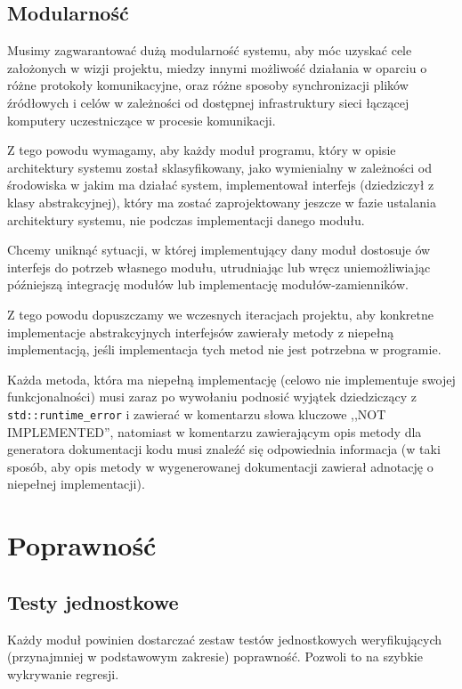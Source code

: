 \documentclass[a4paper]{article}
\begin{document}
\subsection{Modularność}

Musimy zagwarantować dużą modularność systemu, aby móc uzyskać cele założonych w wizji projektu, miedzy innymi możliwość działania w oparciu o różne protokoły komunikacyjne, oraz różne sposoby synchronizacji plików źródłowych i celów w zależności od dostępnej infrastruktury sieci łączącej komputery uczestniczące w procesie komunikacji.

Z tego powodu wymagamy, aby każdy moduł programu, który w opisie architektury systemu został sklasyfikowany, jako wymienialny w zależności od środowiska w jakim ma działać system, implementował interfejs (dziedziczył z klasy abstrakcyjnej), który ma zostać zaprojektowany jeszcze w fazie ustalania architektury systemu, nie podczas implementacji danego modułu.

Chcemy uniknąć sytuacji, w której implementujący dany moduł dostosuje ów interfejs do potrzeb własnego modułu, utrudniając lub wręcz uniemożliwiając późniejszą integrację modułów lub implementację modułów-zamienników.

Z tego powodu dopuszczamy we wczesnych iteracjach projektu, aby konkretne implementacje abstrakcyjnych interfejsów zawierały metody z niepełną implementacją, jeśli implementacja tych metod nie jest potrzebna w programie.

Każda metoda, która ma niepełną implementację (celowo nie implementuje swojej funkcjonalności) musi zaraz po wywołaniu podnosić wyjątek dziedziczący z \verb+std::runtime_error+ i zawierać w komentarzu słowa kluczowe ,,NOT IMPLEMENTED'', natomiast w komentarzu zawierającym opis metody dla generatora dokumentacji kodu musi znaleźć się odpowiednia informacja (w taki sposób, aby opis metody w wygenerowanej dokumentacji zawierał adnotację o niepełnej implementacji).

\section{Poprawność}

\subsection{Testy jednostkowe}

Każdy moduł powinien dostarczać zestaw testów jednostkowych weryfikujących (przynajmniej w podstawowym zakresie) poprawność. Pozwoli to na szybkie wykrywanie regresji.
\end{document}
